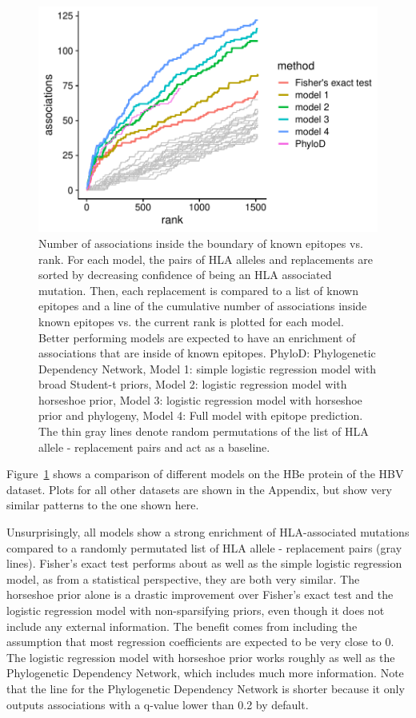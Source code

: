 \documentclass[fleqn,11pt]{SelfArx} %
\begin{document}
\begin{figure}[ht!]
  \includegraphics[width=1\linewidth]{plots/comparison.pdf}
  \caption{Number of associations inside the boundary of known epitopes vs. rank. For each model, the pairs of HLA alleles and replacements are sorted by decreasing confidence of being an HLA associated mutation. Then, each replacement is compared to a list of known epitopes and a line of the cumulative number of associations inside known epitopes vs. the current rank is plotted for each model. Better performing models are expected to have an enrichment of associations that are inside of known epitopes. 
  PhyloD: Phylogenetic Dependency Network, Model 1: simple logistic regression model with broad Student-t priors, Model 2: logistic regression model with horseshoe prior, Model 3: logistic regression model with horseshoe prior and phylogeny, Model 4: Full model with epitope prediction. The thin gray lines denote random permutations of the list of HLA allele - replacement pairs and act as a baseline.}
  \label{fig:comparison}
\end{figure}

Figure~\ref{fig:comparison} shows a comparison of different models on the HBe protein of the HBV dataset. Plots for all other datasets are shown in the Appendix, but show very similar patterns to the one shown here.

Unsurprisingly, all models show a strong enrichment of HLA-associated mutations compared to a randomly permutated list of HLA allele - replacement pairs (gray lines). Fisher's exact test performs about as well as the simple logistic regression model, as from a statistical perspective, they are both very similar.
The horseshoe prior alone is a drastic improvement over Fisher's exact test and the logistic regression model with non-sparsifying priors, even though it does not include any external information. The benefit comes from including the assumption that most regression coefficients are expected to be very close to 0.
The logistic regression model with horseshoe prior works roughly as well as the Phylogenetic Dependency Network, which includes much more information.
Note that the line for the Phylogenetic Dependency Network is shorter because it only outputs associations with a q-value lower than 0.2 by default.
\end{document}
